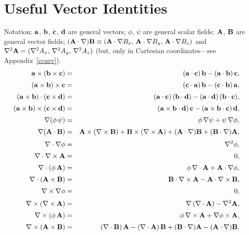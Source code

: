 \section{Useful Vector Identities}
Notation: ${\bf a}$, ${\bf b}$, ${\bf c}$, ${\bf d}$ are general vectors; $\phi$, $\psi$
are general scalar fields; ${\bf A}$, ${\bf B}$ are general vector fields; $({\bf A}\cdot\nabla){\bf B}\equiv
({\bf A}\cdot\nabla B_x,\, {\bf A}\cdot\nabla B_y,\,{\bf A}\cdot\nabla B_z)$ and
$\nabla^2{\bf A} = (\nabla^2 A_x,\, \nabla^2 A_y,\,\nabla^2 A_z)$ (but, only  in Cartesian coordinates---see Appendix~\ref{ccurv}).
\begin{eqnarray}
{\bf a}\times ({\bf b}\times {\bf c}) &=& ({\bf a}\cdot{\bf c})\,{\bf b} - ({\bf a}\cdot{\bf b})\,{\bf c},\\[0.5ex]
({\bf a}\times {\bf b})\times {\bf c} &=& ({\bf c}\cdot{\bf a})\,{\bf b}
- ({\bf c}\cdot{\bf b})\,{\bf a},\\[0.5ex]
({\bf a}\times {\bf b})\cdot({\bf c}\times {\bf d})&=&
({\bf a}\cdot{\bf c})\,({\bf b}\cdot{\bf d}) - ({\bf a}\cdot{\bf d})\,({\bf b}\cdot{\bf c}),\\[0.5ex]
({\bf a}\times {\bf b})\times ({\bf c}\times {\bf d})&=& ({\bf a}\times
{\bf b}\cdot{\bf d})\,{\bf c} - ({\bf a}\times {\bf b}\cdot{\bf c})\,{\bf d},\\[0.5ex]
\nabla(\phi\,\psi) &=&\phi\,\nabla\psi+\psi\,\nabla\phi,\\[0.5ex]
\nabla({\bf A}\cdot{\bf B}) &=& {\bf A}\times(\nabla\times{\bf B}) + {\bf B}
\times(\nabla\times{\bf A}) +({\bf A}\cdot \nabla){\bf B} + ({\bf B} \cdot
\nabla){\bf A},\label{divsp}\\[0.5ex]
\nabla\cdot\nabla \phi&=&\nabla^2\phi,\label{laplacian}\\[0.5ex]
\nabla\cdot\nabla \times {\bf A}& =& 0,\label{divcurl}\\[0.5ex]
\nabla\cdot (\phi\,{\bf A}) &=&\phi \,\nabla\cdot {\bf A} + {\bf A}\cdot \nabla\phi,\label{divprod}\\[0.5ex]
\nabla\cdot({\bf A}\times{\bf B}) &=& {\bf B}\cdot \nabla\times{\bf A} - {\bf A}\cdot
\nabla\times{\bf B},\label{divvp}\\[0.5ex]
\nabla\times\nabla\phi &=& 0,\label{curlgrad}\\[0.5ex]
\nabla\times(\nabla\times{\bf A})&=& \nabla\,(\nabla\cdot{\bf A})- \nabla^2{\bf A},\label{curlcurl}\\[0.5ex]
\nabla\times(\phi\,{\bf A}) &=&\phi\, \nabla\times{\bf A} +\nabla\phi\times{\bf A},\label{curlprod}\\[0.5ex]
\nabla\times({\bf A}\times{\bf B})& =& (\nabla\cdot {\bf B})\,{\bf A}- (\nabla
\cdot{\bf A}) \,{\bf B}+({\bf B}\cdot\nabla){\bf A}- ({\bf A}\cdot\nabla){\bf B}.\label{curlvp}
\end{eqnarray}

